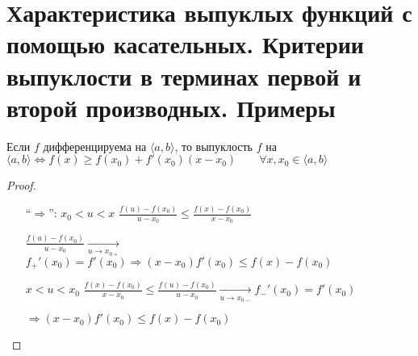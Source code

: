 \section{Характеристика выпуклых функций с помощью касательных. Критерии выпуклости в терминах первой и второй производных. Примеры}
\begin{theorem-non}
    Если $f$ дифференцируема на $\langle a, b \rangle$, то выпуклость $f$ на $\langle a, b \rangle \Longleftrightarrow
    f(x) \geqslant f(x_0) + f'(x_0)(x - x_0) \qquad \forall x, x_0 \in \langle a, b \rangle $


    \begin{proof} \quad 

        \begin{itemize}
            \item[``$\Longrightarrow$'':] $x_0 < u < x$ \qquad 
            $\frac{f(u) - f(x_0)}{u - x_0} \leqslant \frac{f(x) - f(x_0)}{x - x_0}$

            $\frac{f(u) - f(x_0)}{u - x_0} \underset{u \rightarrow x_{0+}}{\longrightarrow}$
            $f_{+}'(x_0) = f'(x_0) \Longrightarrow (x - x_0)f'(x_0) \leqslant f(x) - f(x_0)$

            $x < u < x_0$ \qquad 
            $\frac{f(x) - f(x_0)}{x - x_0} \leqslant \frac{f(u) - f(x_0)}{u - x_0}
            \underset{u \rightarrow x_{0-}}{\longrightarrow}
            f_{-}'(x_0) = f'(x_0)$
            
            $\Longrightarrow (x - x_0)f'(x_0) \leqslant f(x) - f(x_0)$


\end{itemize}
\end{proof}
\end{theorem-non}
